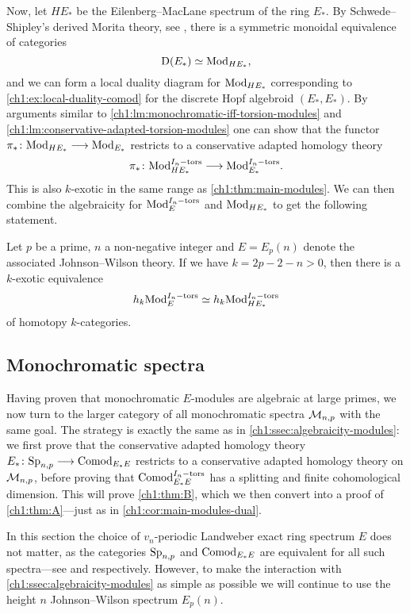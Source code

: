 Now, let $HE_*$ be the Eilenberg--MacLane spectrum of the ring $E_*$. By Schwede--Shipley's derived Morita theory, see \cite[7.1.1.16]{Lurie_HA}, there is a symmetric monoidal equivalence of categories 
\[\mathrm{D}(E_*)\simeq \mathrm{Mod}_{HE_*},\] 
and we can form a local duality diagram for $\mathrm{Mod}_{HE_*}$ corresponding to \cref{ch1:ex:local-duality-comod} for the discrete Hopf algebroid $(E_*, E_*)$. By arguments similar to \cref{ch1:lm:monochromatic-iff-torsion-modules} and \cref{ch1:lm:conservative-adapted-torsion-modules} one can show that the functor $\pi_*\colon \mathrm{Mod}_{HE_*}\longrightarrow \mathrm{Mod}_{E_*}$ restricts to a conservative adapted homology theory 
\[\pi_* \colon \mathrm{Mod}_{HE_*}^{I_n-\mathrm{tors}}\longrightarrow \mathrm{Mod}_{E_*}^{I_n-\mathrm{tors}}.\]
This is also $k$-exotic in the same range as \cref{ch1:thm:main-modules}. We can then combine the algebraicity for $\mathrm{Mod}_{E}^{I_n-\mathrm{tors}}$ and $\mathrm{Mod}_{HE_*}$ to get the following statement. 

\begin{corollary}
    Let $p$ be a prime, $n$ a non-negative integer and $E = E_p(n)$ denote the associated Johnson--Wilson theory. If we have $k=2p-2-n>0$, then there is a $k$-exotic equivalence 
    \[h_k \mathrm{Mod}_{E}^{I_n-\mathrm{tors}} \simeq h_k \mathrm{Mod}_{HE_*}^{I_n-\mathrm{tors}}\]
    of homotopy $k$-categories. 
\end{corollary}



\subsection{Monochromatic spectra}
\label{ch1:ssec:algebraicity-spectra}

Having proven that monochromatic $E$-modules are algebraic at large primes, we now turn to the larger category of all monochromatic spectra $\mathcal{M}_{n,p}$ with the same goal. The strategy is exactly the same as in \cref{ch1:ssec:algebraicity-modules}: we first prove that the conservative adapted homology theory $E_*\colon \mathrm{Sp}_{n,p}\longrightarrow \mathrm{Comod}_{E_*E}$ restricts to a conservative adapted homology theory on $\mathcal{M}_{n,p}$, before proving that $\mathrm{Comod}_{E_*E}^{I_n-\mathrm{tors}}$ has a splitting and finite cohomological dimension. This will prove \cref{ch1:thm:B}, which we then convert into a proof of \cref{ch1:thm:A}---just as in \cref{ch1:cor:main-modules-dual}. 

In this section the choice of $v_n$-periodic Landweber exact ring spectrum $E$ does not matter, as the categories $\mathrm{Sp}_{n,p}$ and $\mathrm{Comod}_{E_*E}$ are equivalent for all such spectra---see \cite[1.12]{hovey_95} and \cite[4.2]{hovey-strickland_2005a} respectively. However, to make the interaction with \cref{ch1:ssec:algebraicity-modules} as simple as possible we will continue to use the height $n$ Johnson--Wilson spectrum $E_p(n)$.

